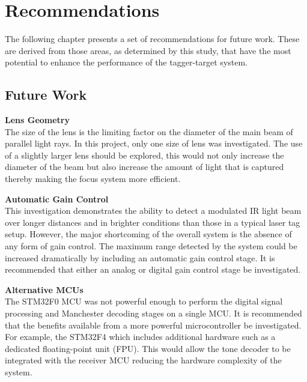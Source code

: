 \chapter{Recommendations}
\label{ch_recommendations}



The following chapter presents a set of recommendations for future work. These are derived from those areas, as determined by this study, that have the most potential to enhance the performance of the tagger-target system.

\section{Future Work}

\textbf{Lens Geometry}\\
The size of the lens is the limiting factor on the diameter of the main beam of parallel light rays. In this project, only one size of lens was investigated. The use of a slightly larger lens should be explored, this would not only increase the diameter of the beam but also increase the amount of light that is captured thereby making the focus system more efficient.

\textbf{Automatic Gain Control}\\
This investigation demonstrates the ability to detect a modulated IR light beam over longer distances and in brighter conditions than those in a typical laser tag setup. However, the major shortcoming of the overall system is the absence of any form of gain control. The maximum range detected by the system could be increased dramatically by including an automatic gain control stage. It is recommended that either an analog or digital gain control stage be investigated.

\textbf{Alternative MCUs}\\
The STM32F0 MCU was not powerful enough to perform the digital signal processing and Manchester decoding stages on a single MCU. It is recommended that the benefits available from a more powerful microcontroller be investigated. For example, the STM32F4 which includes additional hardware such as a dedicated floating-point unit (FPU). This would allow the tone decoder to be integrated with the receiver MCU reducing the hardware complexity of the system.

